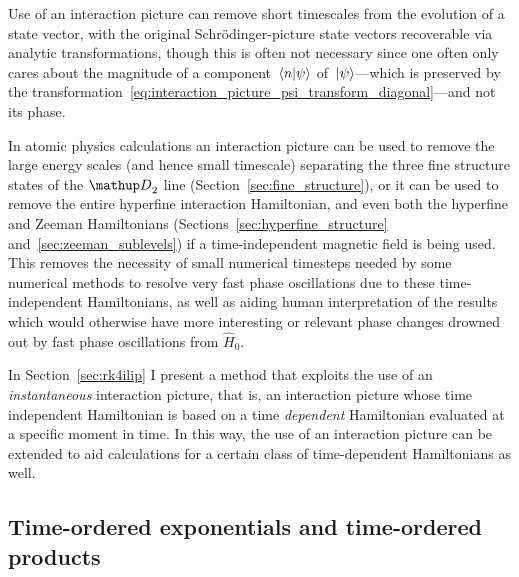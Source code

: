 Use of an interaction picture can remove short timescales from the evolution of a state vector, with the original Schr\"odinger-picture state vectors recoverable via analytic transformations, though this is often not necessary since one often only cares about the magnitude of a component $\braket{n}{\psi}$ of $\ket\psi$---which is preserved by the transformation~\eqref{eq:interaction_picture_psi_transform_diagonal}---and not its phase.

In atomic physics calculations an interaction picture can be used to remove the large energy scales (and hence small timescale) separating the three fine structure states of the $\up{D}_2$ line (Section~\ref{sec:fine_structure}), or it can be used to remove the entire hyperfine interaction Hamiltonian, and even both the hyperfine and Zeeman Hamiltonians (Sections~\ref{sec:hyperfine_structure} and~\ref{sec:zeeman_sublevels}) if a time-independent magnetic field is being used. This removes the necessity of small numerical timesteps needed by some numerical methods to resolve very fast phase oscillations due to these time-independent Hamiltonians, as well as aiding human interpretation of the results which would otherwise have more interesting or relevant phase changes drowned out by fast phase oscillations from $\hat H_0$.

In Section~\ref{sec:rk4ilip} I present a method that exploits the use of an \emph{instantaneous} interaction picture, that is, an interaction picture whose time independent Hamiltonian is based on a time \emph{dependent} Hamiltonian evaluated at a specific moment in time. In this way, the use of an interaction picture can be extended to aid calculations for a certain class of time-dependent Hamiltonians as well.

\subsection{Time-ordered exponentials and time-ordered products}\label{sec:time_ordered_products}

